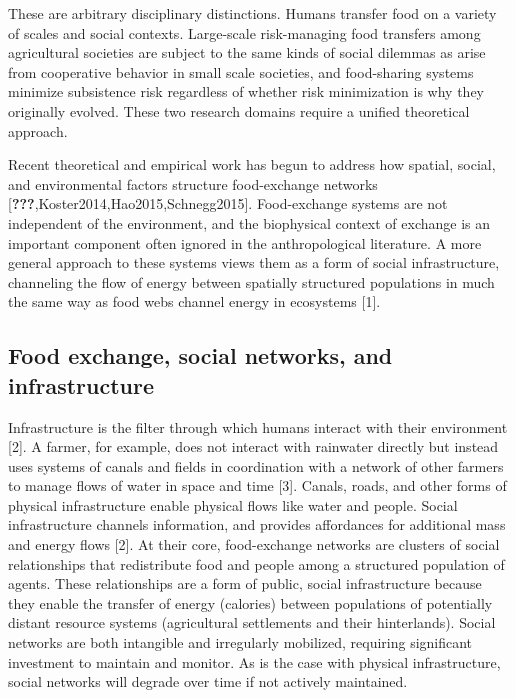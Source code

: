 \documentclass[10pt,letterpaper]{article}
\begin{document}
These are arbitrary disciplinary distinctions. Humans transfer food on a
variety of scales and social contexts. Large-scale risk-managing food
transfers among agricultural societies are subject to the same kinds of
social dilemmas as arise from cooperative behavior in small scale
societies, and food-sharing systems minimize subsistence risk regardless
of whether risk minimization is why they originally evolved. These two
research domains require a unified theoretical approach.

Recent theoretical and empirical work has begun to address how spatial,
social, and environmental factors structure food-exchange networks
{[}{\textbf{???}},Koster2014,Hao2015,Schnegg2015{]}. Food-exchange
systems are not independent of the environment, and the biophysical
context of exchange is an important component often ignored in the
anthropological literature. A more general approach to these systems
views them as a form of social infrastructure, channeling the flow of
energy between spatially structured populations in much the same way as
food webs channel energy in ecosystems {[}1{]}.

\subsection{Food exchange, social networks, and
infrastructure}\label{food-exchange-social-networks-and-infrastructure}

Infrastructure is the filter through which humans interact with their
environment {[}2{]}. A farmer, for example, does not interact with
rainwater directly but instead uses systems of canals and fields in
coordination with a network of other farmers to manage flows of water in
space and time {[}3{]}. Canals, roads, and other forms of physical
infrastructure enable physical flows like water and people. Social
infrastructure channels information, and provides affordances for
additional mass and energy flows {[}2{]}. At their core, food-exchange
networks are clusters of social relationships that redistribute food and
people among a structured population of agents. These relationships are
a form of public, social infrastructure because they enable the transfer
of energy (calories) between populations of potentially distant resource
systems (agricultural settlements and their hinterlands). Social
networks are both intangible and irregularly mobilized, requiring
significant investment to maintain and monitor. As is the case with
physical infrastructure, social networks will degrade over time if not
actively maintained.
\end{document}
